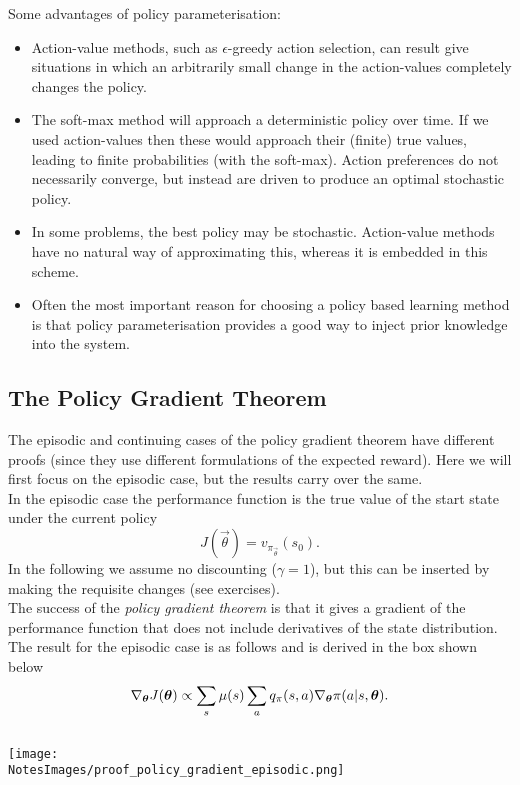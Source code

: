 Some advantages of policy parameterisation:
\begin{itemize}
    \item Action-value methods, such as $\epsilon$-greedy action selection, can result give situations in which an arbitrarily small change in the action-values completely changes the policy.
    \item The soft-max method will approach a deterministic policy over time. If we used action-values then these would approach their (finite) true values, leading to finite probabilities (with the soft-max). Action preferences do not necessarily converge, but instead are driven to produce an optimal stochastic policy.
    \item In some problems, the best policy may be stochastic. Action-value methods have no natural way of approximating this, whereas it is embedded in this scheme.
    \item Often the most important reason for choosing a policy based learning method is that policy parameterisation provides a good way to inject prior knowledge into the system.
\end{itemize}

\subsection{The Policy Gradient Theorem}
The episodic and continuing cases of the policy gradient theorem have different proofs (since they use different formulations of the expected reward). Here we will first focus on the episodic case, but the results carry over the same.\\

In the episodic case the performance function is the true value of the start state under the current policy
\[
    J(\vec{\theta}) = v_{\pi_{\vec{\theta}}}(s_0).
\]
In the following we assume no discounting ($\gamma = 1$), but this can be inserted by making the requisite changes (see exercises).\\

The success of the \emph{policy gradient theorem} is that it gives a gradient of the performance function that does not include derivatives of the state distribution. The result for the episodic case is as follows and is derived in the box shown below
\[
    \nabla_{\boldsymbol{\theta}} J(\boldsymbol{\theta}) \propto \sum_s \mu(s) \sum_a q_\pi(s, a) \nabla_{\boldsymbol{\theta}} \pi(a \vert{} s, \boldsymbol{\theta}).
\]\\

\texttt{[image: \\NotesImages/proof\_policy\_gradient\_episodic.png]}\\

